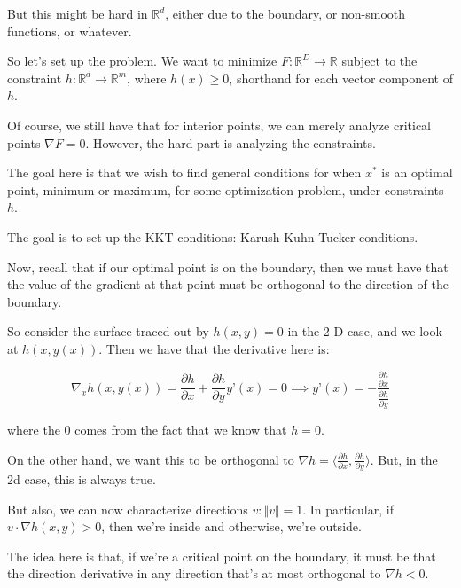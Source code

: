 \documentclass[10pt]{article}
\begin{document}
But this might be hard in $\mathbb{R}^d$, either due to the boundary, or non-smooth functions, or whatever.

So let’s set up the problem. We want to minimize $F: \mathbb{R}^D \to \mathbb{R}$ subject to the constraint $h: \mathbb{R}^d \to \mathbb{R}^{m}$, where $h(x) \geq 0$, shorthand for each vector component of $h$. 

Of course, we still have that for interior points, we can merely analyze critical points $\nabla F = 0$. However, the hard part is analyzing the constraints.

The goal here is that we wish to find general conditions for when $x^*$ is an optimal point, minimum or maximum, for some optimization problem, under constraints $h$. 

The goal is to set up the KKT conditions: Karush-Kuhn-Tucker conditions.

Now, recall that if our optimal point is on the boundary, then we must have that the value of the gradient at that point must be orthogonal to the direction of the boundary.

So consider the surface traced out by $h(x,y) = 0$ in the 2-D case, and we look at $h(x, y(x))$. Then we have that the derivative here is:

$$ \nabla_x h(x, y(x)) = \frac{\partial h}{ \partial x} + \frac{ \partial h}{ \partial y} y’(x) = 0  \implies y’(x) = -  \frac{\frac{\partial h}{ \partial x}}{\frac{ \partial h}{ \partial y}}  $$

where the 0 comes from the fact that we know that $h = 0$.

On the other hand, we want this to be orthogonal to $\nabla h = \langle  \frac{\partial h}{ \partial x}, \frac{ \partial h}{ \partial y}\rangle$. But, in the 2d case, this is always true.

But also, we can now characterize directions $v : \Vert v \Vert = 1$. In particular, if $v \cdot \nabla h(x,y) > 0$, then we’re inside and otherwise, we’re outside.

The idea here is that, if we’re a critical point on the boundary, it must be that the direction derivative in any direction that’s at most orthogonal to $\nabla h < 0$. 
\end{document}
